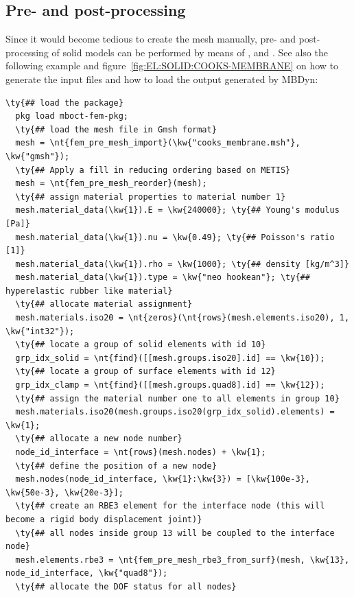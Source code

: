 \subsection{Pre- and post-processing}
\label{sec:EL:SOLID:preprocessing}
Since it would become tedious to create the mesh manually, pre- and post-processing of solid models
can be performed by means of ,
and .
See also the following example and figure~\ref{fig:EL:SOLID:COOKS-MEMBRANE} on how to generate the input files and how to load the output generated by MBDyn:

\begin{Verbatim}[commandchars=\\\{\}]
  \ty{## load the package}
  pkg load mboct-fem-pkg;
  \ty{## load the mesh file in Gmsh format}
  mesh = \nt{fem_pre_mesh_import}(\kw{"cooks_membrane.msh"}, \kw{"gmsh"});
  \ty{## Apply a fill in reducing ordering based on METIS}
  mesh = \nt{fem_pre_mesh_reorder}(mesh);
  \ty{## assign material properties to material number 1}
  mesh.material_data(\kw{1}).E = \kw{240000}; \ty{## Young's modulus [Pa]}
  mesh.material_data(\kw{1}).nu = \kw{0.49}; \ty{## Poisson's ratio [1]}
  mesh.material_data(\kw{1}).rho = \kw{1000}; \ty{## density [kg/m^3]}
  mesh.material_data(\kw{1}).type = \kw{"neo hookean"}; \ty{## hyperelastic rubber like material}
  \ty{## allocate material assignment}
  mesh.materials.iso20 = \nt{zeros}(\nt{rows}(mesh.elements.iso20), 1, \kw{"int32"});
  \ty{## locate a group of solid elements with id 10}
  grp_idx_solid = \nt{find}([[mesh.groups.iso20].id] == \kw{10});
  \ty{## locate a group of surface elements with id 12}
  grp_idx_clamp = \nt{find}([[mesh.groups.quad8].id] == \kw{12});
  \ty{## assign the material number one to all elements in group 10}
  mesh.materials.iso20(mesh.groups.iso20(grp_idx_solid).elements) = \kw{1};
  \ty{## allocate a new node number}
  node_id_interface = \nt{rows}(mesh.nodes) + \kw{1};
  \ty{## define the position of a new node}
  mesh.nodes(node_id_interface, \kw{1}:\kw{3}) = [\kw{100e-3}, \kw{50e-3}, \kw{20e-3}];
  \ty{## create an RBE3 element for the interface node (this will become a rigid body displacement joint)}
  \ty{## all nodes inside group 13 will be coupled to the interface node}
  mesh.elements.rbe3 = \nt{fem_pre_mesh_rbe3_from_surf}(mesh, \kw{13}, node_id_interface, \kw{"quad8"});
  \ty{## allocate the DOF status for all nodes}

\end{Verbatim}
